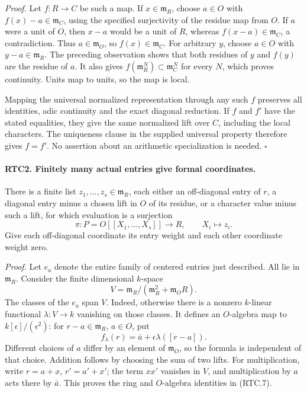 \emph{Proof.}
Let \(f:R\to C\) be such a map.  If \(x\in\mathfrak m_R\),
choose \(a\in O\) with \(f(x)-a\in\mathfrak m_C\), using the
specified surjectivity of the residue map from \(O\).  If \(a\)
were a unit of \(O\), then \(x-a\) would be a unit of \(R\),
whereas \(f(x-a)\in\mathfrak m_C\), a contradiction.  Thus
\(a\in\mathfrak m_O\), so \(f(x)\in\mathfrak m_C\).
For arbitrary \(y\), choose \(a\in O\) with
\(y-a\in\mathfrak m_R\).  The preceding observation shows that
both residues of \(y\) and \(f(y)\) are the residue of \(a\).
It also gives
\(f(\mathfrak m_R^N)\subset\mathfrak m_C^N\) for every \(N\),
which proves continuity.  Units map to units, so the map is local.

Mapping the universal normalized representation through any such
\(f\) preserves all identities, adic continuity and the exact
diagonal reduction.  If \(f\) and \(f'\) have the stated equalities,
they give the same normalized lift over \(C\), including the local
characters.  The uniqueness clause in the supplied universal property
therefore gives \(f=f'\).  No assertion about an arithmetic
specialization is needed. \hfill\(\square\)

\paragraph{RTC2. Finitely many actual entries give formal coordinates.}
\label{claim:RTC2}
There is a finite list \(z_1,\ldots,z_s\in\mathfrak m_R\), each
either an off-diagonal entry of \(r\), a diagonal entry minus a
chosen lift in \(O\) of its residue, or a character value minus
such a lift, for which evaluation is a surjection
\[
 \pi:P=O[[X_1,\ldots,X_s]]\longrightarrow R,
       \qquad X_i\longmapsto z_i.
                                                        \tag{RTC.6}
\]
Give each off-diagonal coordinate its entry weight and each other
coordinate weight zero.

\emph{Proof.}
Let \(e_a\) denote the entire family of centered entries just
described.  All lie in \(\mathfrak m_R\).  Consider the finite
dimensional \(k\)-space
\[
 V=\mathfrak m_R/(\mathfrak m_R^2+\mathfrak m_OR).
\]
The classes of the \(e_a\) span \(V\).  Indeed, otherwise there
is a nonzero \(k\)-linear functional \(\lambda:V\to k\)
vanishing on those classes.  It defines an \(O\)-algebra map to
\(k[\epsilon]/(\epsilon^2)\): for \(r-a\in\mathfrak m_R\),
\(a\in O\), put
\[
 f_\lambda(r)=\bar a+\epsilon\lambda([r-a]).
                                                        \tag{RTC.7}
\]
Different choices of \(a\) differ by an element of
\(\mathfrak m_O\), so the formula is independent of that choice.
Addition follows by choosing the sum of two lifts.  For multiplication,
write \(r=a+x\), \(r'=a'+x'\); the term \(xx'\) vanishes in
\(V\), and multiplication by \(a\) acts there by \(\bar a\).
This proves the ring and \(O\)-algebra identities in (RTC.7).

